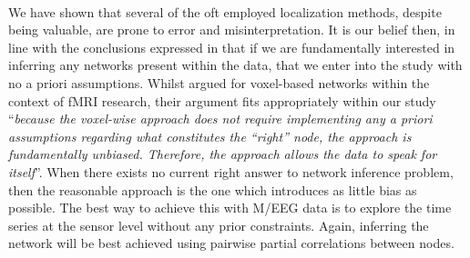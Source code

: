 \documentclass[11pt]{article}
\begin{document}
\\
We have shown that several of the oft employed localization methods, despite being valuable, are prone to error and misinterpretation. It is our belief then, in line with the conclusions expressed in \citep{stnode} that if we are fundamentally interested in inferring any networks present within the data, that we enter into the study with no a priori assumptions. Whilst \citet{stnode} argued for voxel-based networks within the context of fMRI research, their argument fits appropriately within our study ``\emph{because the voxel-wise approach does not require implementing any a priori assumptions regarding what constitutes the “right” node, the approach is fundamentally unbiased. Therefore, the approach allows the data to speak for itself}''. When there exists no current right answer to network inference problem, then the reasonable approach is the one which introduces as little bias as possible. The best way to achieve this with M/EEG data is to explore the time series at the sensor level without any prior constraints. Again, inferring the network will be best achieved using pairwise partial correlations between nodes.
\end{document}
